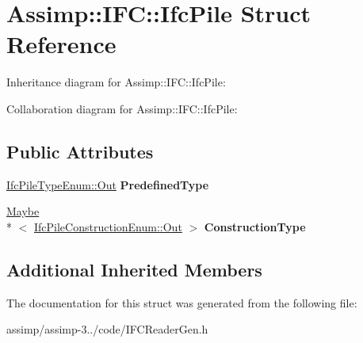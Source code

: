 \hypertarget{struct_assimp_1_1_i_f_c_1_1_ifc_pile}{\section{Assimp\+:\+:I\+F\+C\+:\+:Ifc\+Pile Struct Reference}
\label{struct_assimp_1_1_i_f_c_1_1_ifc_pile}
}


Inheritance diagram for Assimp\+:\+:I\+F\+C\+:\+:Ifc\+Pile\+:


Collaboration diagram for Assimp\+:\+:I\+F\+C\+:\+:Ifc\+Pile\+:
\subsection*{Public Attributes}
\begin{DoxyCompactItemize}
\item 
\hypertarget{struct_assimp_1_1_i_f_c_1_1_ifc_pile_af08f00e24a5d973001d187b849b64b2a}{\hyperlink{classboost_1_1shared__ptr}{Ifc\+Pile\+Type\+Enum\+::\+Out} {\bfseries Predefined\+Type}}\label{struct_assimp_1_1_i_f_c_1_1_ifc_pile_af08f00e24a5d973001d187b849b64b2a}

\item 
\hypertarget{struct_assimp_1_1_i_f_c_1_1_ifc_pile_a9390a7940b0fee5c3b9165cc117cb64d}{\hyperlink{struct_assimp_1_1_s_t_e_p_1_1_maybe}{Maybe}\\*
$<$ \hyperlink{classboost_1_1shared__ptr}{Ifc\+Pile\+Construction\+Enum\+::\+Out} $>$ {\bfseries Construction\+Type}}\label{struct_assimp_1_1_i_f_c_1_1_ifc_pile_a9390a7940b0fee5c3b9165cc117cb64d}

\end{DoxyCompactItemize}
\subsection*{Additional Inherited Members}


The documentation for this struct was generated from the following file\+:\begin{DoxyCompactItemize}
\item 
assimp/assimp-\/3../code/I\+F\+C\+Reader\+Gen.\+h\end{DoxyCompactItemize}
